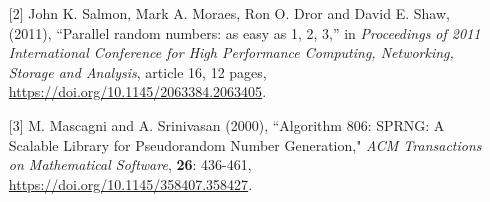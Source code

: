 \begin{talk}
\begin{enumerate}
\item[{[2]}] John K. Salmon, Mark A. Moraes, Ron O. Dror and David E. Shaw, (2011), ``Parallel random numbers: as easy as 1, 2, 3,'' in {\it Proceedings of 2011 International Conference for High Performance Computing, Networking, Storage and Analysis}, article 16, 12 pages, \url{https://doi.org/10.1145/2063384.2063405}.

\item[{[3]}]M. Mascagni and A. Srinivasan (2000), ``Algorithm 806: SPRNG: A Scalable Library for Pseudorandom Number Generation," {\it ACM Transactions on Mathematical Software}, {\bf 26}: 436-461, \url{https://doi.org/10.1145/358407.358427}.

\end{enumerate}

\end{talk}

